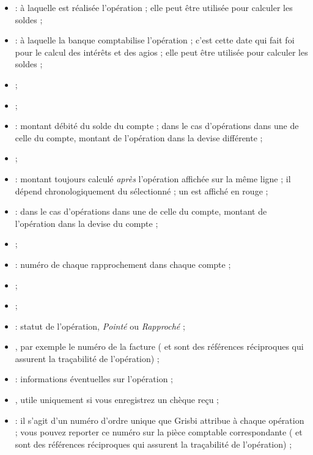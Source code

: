\begin{itemize}
	\item {} :  à laquelle est réalisée l'opération ; elle peut être utilisée pour calculer les soldes ;
	\item {} :  à laquelle la banque comptabilise l'opération ; c'est cette date qui fait foi pour le calcul des intérêts et des agios ; elle peut être utilisée pour calculer les soldes ;
	\item {} ;
	\item {} ;
	\item {} : montant débité du solde du compte ; dans le cas d'opérations dans une  de celle du compte, montant de l'opération dans la devise différente ;
	\item {} ;
	\item {} : montant toujours calculé \emph{après} l'opération affichée sur la même ligne ; il dépend chronologiquement du  sélectionné ; un  est affiché en rouge{\couleur} ;
	\item {} : dans le cas d'opérations dans une  de celle du compte, montant de l'opération dans la devise du compte ;
	\item {} ;
	\item {} : numéro de chaque rapprochement dans chaque compte ;
	\item {} ;
	\item {} ;
	\item {} : statut de l'opération, \emph{Pointé} ou \emph{Rapproché} ;
	\item {}, par exemple le numéro de la facture ( et  sont des références réciproques qui assurent la traçabilité de l'opération) ;
	\item {} : informations éventuelles sur l'opération ;
	\item {}, utile uniquement si vous enregistrez un chèque reçu ;
	\item {} : il s'agit d'un numéro d'ordre unique que Grisbi attribue à chaque opération ; vous pouvez reporter ce numéro sur la pièce comptable correspondante ( et  sont des références réciproques qui assurent la traçabilité de l'opération) ;

\end{itemize}
